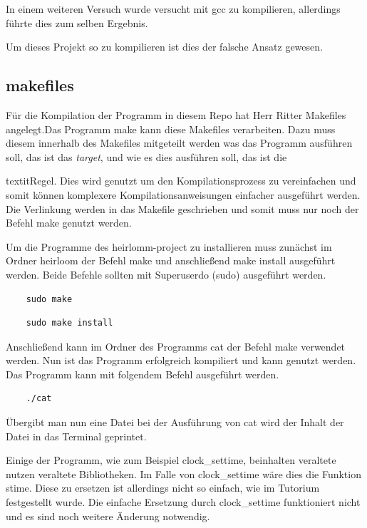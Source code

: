 In einem weiteren Versuch wurde versucht mit gcc zu kompilieren, allerdings führte dies zum selben Ergebnis.\par
Um dieses Projekt so zu kompilieren ist dies der falsche Ansatz gewesen.

\subsection{makefiles}
Für die Kompilation der Programm in diesem Repo hat Herr Ritter Makefiles angelegt.Das Programm make kann diese Makefiles verarbeiten.
Dazu muss diesem innerhalb des Makefiles mitgeteilt werden was das Programm ausführen soll, das ist das \textit{target}, und wie es dies ausführen soll, das ist die {textit{Regel}\cite{makefiles:2002}.
Dies wird genutzt um den Kompilationsprozess zu vereinfachen und somit können komplexere Kompilationsanweisungen einfacher ausgeführt werden.
Die Verlinkung werden in das Makefile geschrieben und somit muss nur noch der Befehl make genutzt werden.\par
Um die Programme des heirlomm-project zu installieren muss zunächst im Ordner heirloom der Befehl make und anschließend make install ausgeführt werden.
Beide Befehle sollten mit Superuserdo (sudo) ausgeführt werden.\par

\begin{lstlisting}
	sudo make
\end{lstlisting}

\begin{lstlisting}
	sudo make install 
\end{lstlisting}

Anschließend kann im Ordner des Programms cat der Befehl make verwendet werden.
Nun ist das Programm erfolgreich kompiliert und kann genutzt werden.
Das Programm kann mit folgendem Befehl ausgeführt werden.\par

\begin{lstlisting}
	./cat
\end{lstlisting}

Übergibt man nun eine Datei bei der Ausführung von cat wird der Inhalt der Datei in das Terminal geprintet.\par
Einige der Programm, wie zum Beispiel clock\_settime, beinhalten veraltete nutzen veraltete Bibliotheken.
Im Falle von clock\_settime wäre dies die Funktion stime\cite{stime:2023}.
Diese zu ersetzen ist allerdings nicht so einfach, wie im Tutorium festgestellt wurde.
Die einfache Ersetzung durch clock\_settime funktioniert nicht und es sind noch weitere Änderung notwendig. \par

}
